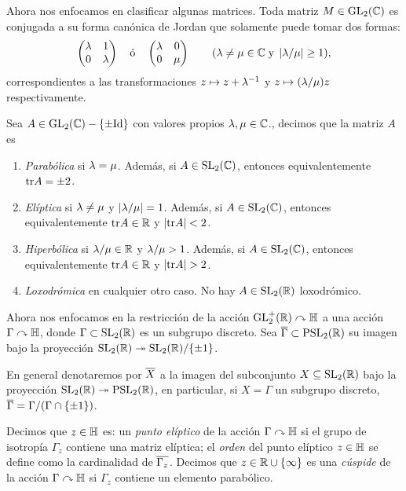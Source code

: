 \documentclass[../../tesis_maestria]{subfiles}
\begin{document}
Ahora nos enfocamos en clasificar algunas matrices. Toda matriz $M\in\mathrm{GL}_2(\mathbb{C})$ es conjugada
a su forma can\'onica de Jordan que solamente puede tomar dos formas:
\[
  \begin{pmatrix}\lambda & 1\\ 0 & \lambda\end{pmatrix} \quad\text{\'o}\quad \begin{pmatrix}\lambda & 0\\ 0 & \mu\end{pmatrix}\qquad
  (\lambda\neq\mu\in\mathbb{C}\;\text{y}\;\left| \lambda/\mu \right|\geq1),
\]
correspondientes a las transformaciones $z\mapsto z+\lambda^{-1}$ y $z\mapsto (\lambda/\mu)z$ respectivamente.

\begin{defin}
  Sea $A\in\mathrm{GL}_2(\mathbb{C})-\{\pm\mathrm{Id}\}$ con valores propios $\lambda,\mu\in\mathbb{C}$., decimos que la matriz $A$
  es
  \begin{enumerate}
  \item \emph{Parab\'olica} si $\lambda=\mu$. Adem\'as, si $A\in\mathrm{SL}_2(\mathbb{C})$, entonces equivalentemente
    $\mathrm{tr} A=\pm2$.
  \item \emph{El\'iptica} si $\lambda\neq\mu$ y $\left| \lambda/\mu \right|=1$.  Adem\'as, si $A\in\mathrm{SL}_2(\mathbb{C})$,
    entonces equivalentemente $\mathrm{tr} A\in\mathbb{R}$ y $\left| \mathrm{tr} A \right|<2$.
    \item \emph{Hiperb\'olica} si  $\lambda/\mu\in\mathbb{R}$ y $\lambda/\mu>1$. Adem\'as, si $A\in\mathrm{SL}_2(\mathbb{C})$,
      entonces equivalentemente $\mathrm{tr} A\in\mathbb{R}$ y $\abs{\tr A}>2$.
    \item \emph{Loxodr\'omica} en cualquier otro caso. No hay $A\in\mathrm{SL}_2(\mathbb{R})$ loxodr\'omico.
  \end{enumerate}
\end{defin}


Ahora nos enfocamos en la restricci\'on de la acci\'on $\mathrm{GL}_2^+(\mathbb{R})\curvearrowright\mathbb{H}$ a una acci\'on
$\Gamma\curvearrowright\mathbb{H}$, donde $\Gamma\subset\mathrm{SL}_2(\mathbb{R})$ es un subgrupo discreto.
Sea $\overline{\Gamma}\subset\mathrm{PSL}_2(\mathbb{R})$ su imagen
bajo la proyecci\'on $\mathrm{SL}_2(\mathbb{R})\twoheadrightarrow\mathrm{SL}_2(\mathbb{R})/\{\pm1\}$.

\begin{nota}
  En general denotaremos por $\overline{X}$ a la imagen del subconjunto $X\subseteq\mathrm{SL}_2(\mathbb{R})$ bajo la
  proyecci\'on $\mathrm{SL}_2(\mathbb{R})\twoheadrightarrow\mathrm{PSL}_2(\mathbb{R})$, en particular, si $X=\Gamma$ un subgrupo discreto,
  $\overline{\Gamma}=\Gamma/(\Gamma\cap\{\pm1\})$.
\end{nota}

\begin{defin}
  Decimos que $z\in\mathbb{H}$ es: un \emph{punto el\'iptico} de
  la acci\'on $\Gamma\curvearrowright\mathbb{H}$ si el grupo de isotrop\'ia $\Gamma_z$ contiene una matriz el\'iptica;
  el \emph{orden} del punto el\'iptico $z\in\mathbb{H}$ se define como la cardinalidad de $\overline{\Gamma_z}$.
  Decimos que $z\in\mathbb{R}\cup\{\infty\}$ es una \emph{c\'uspide} de la acci\'on $\Gamma\curvearrowright\mathbb{H}$ si
  $\Gamma_z$ contiene un elemento parab\'olico.
\end{defin}
\end{document}
